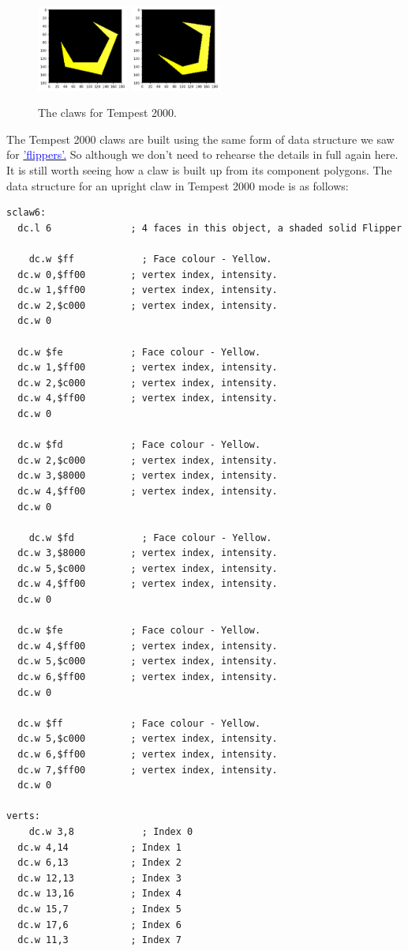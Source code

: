 \begin{figure}[H]
    \includegraphics[width=3cm]{build_t2k_claws/final_claw_6_graph.png}
    \includegraphics[width=3cm]{build_t2k_claws/final_claw_7_graph.png}
  \caption*{The claws for Tempest 2000.}
\end{figure}

The Tempest 2000 claws are built using the same form of data structure we saw for 
\hyperref[sec:flipper]{\textcolor{blue}{'flippers'.}} So although we don't need to 
rehearse the details in full again here. It is still worth seeing how a claw is built
up from its component polygons.
\clearpage
The data structure for an upright claw in Tempest 2000 mode is as follows:
\begin{lstlisting}
sclaw6:
  dc.l 6              ; 4 faces in this object, a shaded solid Flipper
    
	dc.w $ff            ; Face colour - Yellow.
  dc.w 0,$ff00        ; vertex index, intensity.
  dc.w 1,$ff00        ; vertex index, intensity.
  dc.w 2,$c000        ; vertex index, intensity.
  dc.w 0
    
  dc.w $fe            ; Face colour - Yellow.
  dc.w 1,$ff00        ; vertex index, intensity.
  dc.w 2,$c000        ; vertex index, intensity.
  dc.w 4,$ff00        ; vertex index, intensity.
  dc.w 0
    
  dc.w $fd            ; Face colour - Yellow.
  dc.w 2,$c000        ; vertex index, intensity.
  dc.w 3,$8000        ; vertex index, intensity.
  dc.w 4,$ff00        ; vertex index, intensity.
  dc.w 0
    
	dc.w $fd            ; Face colour - Yellow.
  dc.w 3,$8000        ; vertex index, intensity.
  dc.w 5,$c000        ; vertex index, intensity.
  dc.w 4,$ff00        ; vertex index, intensity.
  dc.w 0
    
  dc.w $fe            ; Face colour - Yellow.
  dc.w 4,$ff00        ; vertex index, intensity.
  dc.w 5,$c000        ; vertex index, intensity.
  dc.w 6,$ff00        ; vertex index, intensity.
  dc.w 0
    
  dc.w $ff            ; Face colour - Yellow.
  dc.w 5,$c000        ; vertex index, intensity.
  dc.w 6,$ff00        ; vertex index, intensity.
  dc.w 7,$ff00        ; vertex index, intensity.
  dc.w 0
    
verts:
	dc.w 3,8            ; Index 0
  dc.w 4,14           ; Index 1
  dc.w 6,13           ; Index 2
  dc.w 12,13          ; Index 3
  dc.w 13,16          ; Index 4
  dc.w 15,7           ; Index 5
  dc.w 17,6           ; Index 6
  dc.w 11,3           ; Index 7
\end{lstlisting}

